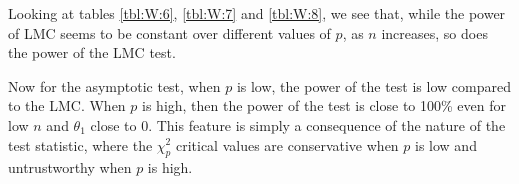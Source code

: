 \documentclass[]{article}\usepackage[]{graphicx}\usepackage[]{color}
\begin{document}
\begin{table}[H]
	\centering
	\caption{Empirical levels for 1000 replications of the Wald statistic where $\alpha = 5\%$, $\theta_1=1$ and $\theta_2=...=\theta_p=0$,  testing $H_0: \theta_1^2 + ...  +\theta_p^2 =0$ against $H_1: \theta_1^2 + ...  +\theta_p^2  \neq 0$}
	\label{tbl:W:8}
\end{table}



Looking at tables \ref{tbl:W:6}, \ref{tbl:W:7} and  \ref{tbl:W:8}, we see that, while the power of LMC seems to be constant over different values of $p$, as $n$ increases, so does the power of the LMC test.

Now for the asymptotic test, when $p$ is low, the power of the test is low compared to the LMC. When $p$ is high, then the power of the test is close to 100\% even for low $n$ and $\theta_1$ close to 0. This feature is simply a consequence of the nature of the test statistic, where the $\chi_p^2$ critical values are conservative when $p$ is low and untrustworthy when $p$ is high.
\end{document}

